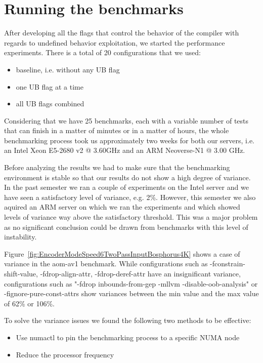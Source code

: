 \section{Running the benchmarks}

After developing all the flags that control the behavior of the compiler with
regards to undefined behavior exploitation, we started the performance
experiments. There is a total of 20 configurations that we used:
\begin{itemize}
  \item baseline, i.e. without any UB flag
  \item one UB flag at a time
  \item all UB flags combined
\end{itemize}

Considering that we have 25 benchmarks, each with a variable number of tests
that can finish in a matter of minutes or in a matter of hours, the whole
benchmarking process took us approximately two weeks for both our servers, i.e.
an Intel Xeon E5-2680 v2 @ 3.60GHz and an ARM Neoverse-N1 @ 3.00 GHz.

Before analyzing the results we had to make sure that the benchmarking
environment is stable so that our results do not show a high degree of variance.
In the past semester we ran a couple of experiments on the Intel server and we
have seen a satisfactory level of variance, e.g. 2\%. However, this semester we
also aquired an ARM server on which we ran the experiments and which showed
levels of variance way above the satisfactory threshold. This was a major
problem as no significant conclusion could be drawn from benchmarks with this
level of instability.

Figure~\ref{fig:EncoderModeSpeed6TwoPassInputBosphorus4K} shows a case of
variance in the aom-av1 benchmark. While configurations such as
-fconstrain-shift-value, -fdrop-align-attr, -fdrop-deref-attr have an
insignificant variance, configurations such as "-fdrop inbounds-from-gep -mllvm
-disable-oob-analysis" or -fignore-pure-const-attrs show variances between the
min value and the max value of 62\% or 106\%.

To solve the variance issues we found the following two methods to be effective:
\begin{itemize}
  \item Use numactl to pin the benchmarking process to a specific NUMA node
  \item Reduce the processor frequency
\end{itemize}

